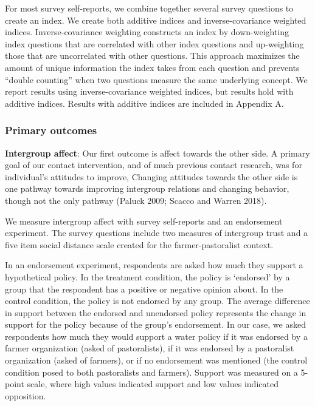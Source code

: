\documentclass[11pt]{article}
\begin{document}
For most survey self-reports, we combine together several survey
questions to create an index. We create both additive indices and
inverse-covariance weighted indices. Inverse-covariance weighting
constructs an index by down-weighting index questions that are
correlated with other index questions and up-weighting those that are
uncorrelated with other questions. This approach maximizes the amount of
unique information the index takes from each question and prevents
``double counting'' when two questions measure the same underlying
concept. We report results using inverse-covariance weighted indices,
but results hold with additive indices. Results with additive indices
are included in Appendix A.

\hypertarget{primary-outcomes}{%
\subsubsection{Primary outcomes}\label{primary-outcomes}}

\textbf{Intergroup affect}: Our first outcome is affect towards the
other side. A primary goal of our contact intervention, and of much
previous contact research, was for individual's attitudes to improve,
Changing attitudes towards the other side is one pathway towards
improving intergroup relations and changing behavior, though not the
only pathway (Paluck 2009; Scacco and Warren 2018).

We measure intergroup affect with survey self-reports and an endorsement
experiment. The survey questions include two measures of intergroup
trust and a five item social distance scale created for the
farmer-pastoralist context.

In an endorsement experiment, respondents are asked how much they
support a hypothetical policy. In the treatment condition, the policy is
`endorsed' by a group that the respondent has a positive or negative
opinion about. In the control condition, the policy is not endorsed by
any group. The average difference in support between the endorsed and
unendorsed policy represents the change in support for the policy
because of the group's endorsement. In our case, we asked respondents
how much they would support a water policy if it was endorsed by a
farmer organization (asked of pastoralists), if it was endorsed by a
pastoralist organization (asked of farmers), or if no endorsement was
mentioned (the control condition posed to both pastoralists and
farmers). Support was measured on a 5-point scale, where high values
indicated support and low values indicated opposition.
\end{document}
